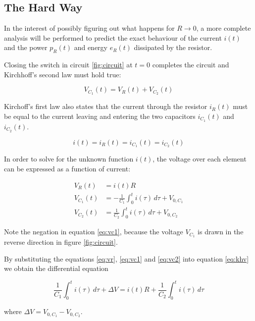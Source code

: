 \subsection{The Hard Way}

In the  interest  of  possibly  figuring out what happens for $R\to 0$, a more
complete  analysis  will  be  performed  to predict the exact behaviour of the
current  $i(t)$ and the power $p_R(t)$ and energy $e_R(t)$ dissipated  by  the
resistor.

Closing the switch in circuit \ref{fig:circuit} at $t=0$ completes the circuit
and Kirchhoff's second law must hold true:

\begin{equation}
    V_{C_1}(t) = V_R(t) + V_{C_2}(t)
    \label{eq:khv}
\end{equation}

Kirchoff's first  law  also  states  that  the  current  through  the resistor
$i_R(t)$ must be equal to the current leaving and entering the  two capacitors
$i_{C_1}(t)$ and $i_{C_2}(t)$.

\begin{equation}
    i(t) = i_R(t) = i_{C_1}(t) = i_{C_2}(t)
    \label{eq:khi}
\end{equation}

In  order to solve for the unknown function  $i(t)$,  the  voltage  over  each
element can be expressed as a function of current:

\begin{align}
    V_R    (t) &= i(t)R \label{eq:vr}\\
    V_{C_1}(t) &= -\frac{1}{C_1}\int_0^t i(\tau)\,d\tau + V_{0,C_1} \label{eq:vc1}\\
    V_{C_2}(t) &= \frac{1}{C_2}\int_0^t i(\tau)\,d\tau + V_{0,C_2} \label{eq:vc2}
\end{align}

Note  the negation in equation \ref{eq:vc1}, because the voltage $V_{C_1}$  is
drawn in the reverse direction in figure \ref{fig:circuit}.

By substituting the equations  \ref{eq:vr}, \ref{eq:vc1} and \ref{eq:vc2} into
equation \ref{eq:khv} we obtain the differential equation

\begin{equation}
    \frac{1}{C_1}\int_0^t i(\tau)\,d\tau + \Delta V = i(t)R + \frac{1}{C_2}\int_0^t i(\tau)\,d\tau
    \label{eq:diff}
\end{equation}

where $\Delta V = V_{0,C_1} - V_{0,C_2}$.

